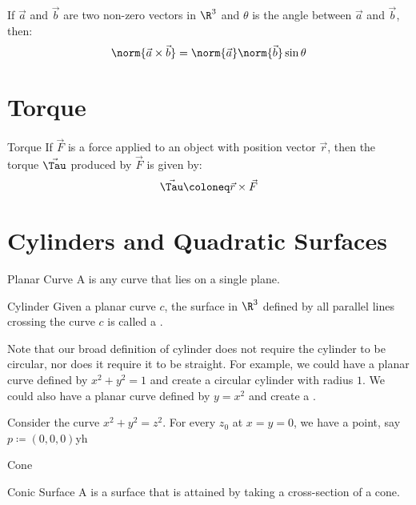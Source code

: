 \documentclass[12pt]{report}
\begin{document}
\begin{thmbox}{}{}
    If $\vec{a}$ and $\vec{b}$ are two non-zero vectors in $\R^3$ and $\theta$ is the angle between $\vec{a}$ and $\vec{b}$, then:
    \[ \norm{\vec{a} \times \vec{b}} = \norm{\vec{a}} \norm{\vec{b}} \sin{\theta} \]
\end{thmbox}

\section{Torque}

\begin{dfnbox}{Torque}{}
    If $\vec{F}$ is a force applied to an object with position vector $\vec{r}$, then the torque $\vec{\Tau}$ produced by $\vec{F}$ is given by:
    \[ \vec{\Tau} \coloneq \vec{r} \times \vec{F} \]
\end{dfnbox}

\section{Cylinders and Quadratic Surfaces}

\begin{dfnbox}{Planar Curve}{}
    A  is any curve that lies on a single plane.
\end{dfnbox}

\begin{dfnbox}{Cylinder}{}
    Given a planar curve $c$, the surface in $\R^3$ defined by all parallel lines crossing the curve $c$ is called a .
\end{dfnbox}

Note that our broad definition of cylinder does not require the cylinder to be circular, nor does it require it to be straight. For example, we could have a planar curve defined by $x^2 + y^2 = 1$ and create a circular cylinder with radius $1$. We could also have a planar curve defined by $y = x^2$ and create a .

\begin{exbox}{}{}
    Consider the curve $x^2+y^2=z^2$. For every $z_0$ at $x=y=0$, we have a point, say $p \coloneq (0,0,0)$yh
\end{exbox}

\begin{dfnbox}{Cone}{}

\end{dfnbox}

\begin{dfnbox}{Conic Surface}{}
    A  is a surface that is attained by taking a cross-section of a cone.
\end{dfnbox}
\end{document}
